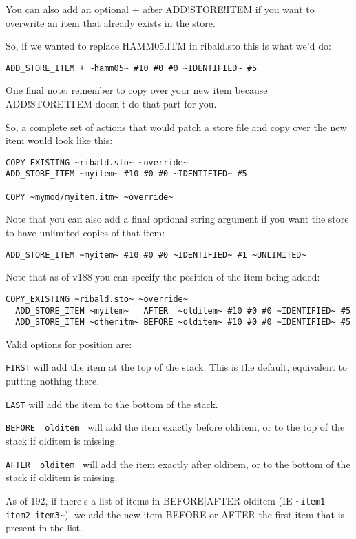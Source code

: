 \documentclass{article}
\def\t#1{{\tt #1}}
\begin{document}
  You can also add an optional + after ADD!STORE!ITEM if you want to
  overwrite an item that already exists in the store.

  So, if we wanted to replace HAMM05.ITM in ribald.sto this is what we'd
  do:

\begin{verbatim}
ADD_STORE_ITEM + ~hamm05~ #10 #0 #0 ~IDENTIFIED~ #5
\end{verbatim}

  One final note: remember to copy over your new item because
  ADD!STORE!ITEM doesn't do that part for you.

  So, a complete set of actions that would patch a store file and copy over
  the new item would look like this:

\begin{verbatim}
COPY_EXISTING ~ribald.sto~ ~override~
ADD_STORE_ITEM ~myitem~ #10 #0 #0 ~IDENTIFIED~ #5

COPY ~mymod/myitem.itm~ ~override~
\end{verbatim}

  Note that you can also add a final optional string argument if you want
  the store to have unlimited copies of that item:

\begin{verbatim}
ADD_STORE_ITEM ~myitem~ #10 #0 #0 ~IDENTIFIED~ #1 ~UNLIMITED~
\end{verbatim}

Note that as of v188 you can specify the position of the item being added:
\begin{verbatim}
COPY_EXISTING ~ribald.sto~ ~override~
  ADD_STORE_ITEM ~myitem~   AFTER  ~olditem~ #10 #0 #0 ~IDENTIFIED~ #5
  ADD_STORE_ITEM ~otheritm~ BEFORE ~olditem~ #10 #0 #0 ~IDENTIFIED~ #5
\end{verbatim}
  Valid options for position are:

  \t{FIRST} will add the item at the top of the stack.
     This is the default, equivalent to putting nothing there.

  \t{LAST} will add the item to the bottom of the stack.

  \t{BEFORE ~olditem~} will add the item exactly before olditem,
    or to the top of the stack if olditem is missing.

  \t{AFTER  ~olditem~} will add the item exactly after olditem,
    or to the bottom of the stack if olditem is missing.

As of 192, if there's a list of items in BEFORE|AFTER olditem (IE \verb+~item1 item2 item3~+),
we add the new item BEFORE or AFTER the first item that is present in the list.
\end{document}
